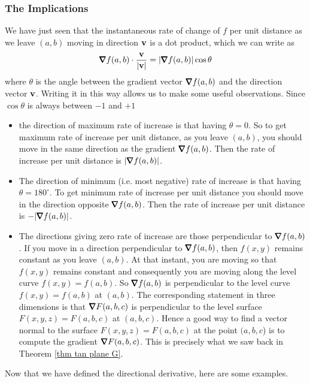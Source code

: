 \subsubsection{The Implications}
We have just seen that the instantaneous rate of change of $f$ per unit
distance as we leave $(a,b)$ moving in direction $\mathbf{v}$ is a dot product,
which we can write as
$$
\vnabla f(a,b)\cdot\frac{\vv}{|\vv|}
       =|\vnabla f(a,b)| \cos \theta
$$
where $\theta$ is the angle between the gradient vector $\vnabla f(a,b)$
and the direction vector $\mathbf{v}$. Writing it in this way allows us to make
some useful observations.
Since $\cos \theta$ is always between $-1$
and $+1$ 
\begin{itemize}
\item 
the direction of maximum rate of increase is that having
$\theta=0$. So to get maximum rate of increase per unit distance, as you 
leave $(a,b)$, you should move in the same direction as the gradient 
$\vnabla f(a,b)$. Then the rate of increase per unit distance is 
$|\vnabla f(a,b)|$.
\item
The direction of minimum (i.e. most negative) rate of increase  is that having
$\theta=180^\circ$. To get minimum rate of increase per unit distance you
should move in the direction opposite  $\vnabla f(a,b)$. Then the
rate of increase per unit distance is $-|\vnabla f(a,b)|$.

\item 
The directions giving zero rate of increase are those 
perpendicular to $\vnabla f(a,b)$. If you move in a direction
perpendicular to $\vnabla f(a,b)$, then $f(x,y)$ remains constant as
you leave $(a,b)$. At that instant, you are moving so that $f(x,y)$
remains constant and consequently you are moving along the level
curve $f(x,y)=f(a,b)$.  So $\vnabla f(a,b)$ is perpendicular to the
level curve $f(x,y)=f(a,b)$ at $(a,b)$. The corresponding statement
in three dimensions is that $\vnabla F(a,b,c)$ is perpendicular to the
level surface $F(x,y,z)=F(a,b,c)$ at $(a,b,c)$. Hence a good way to find a 
vector normal to the surface $F(x,y,z)=F(a,b,c)$ at the point $(a,b,c$) is to compute the gradient $\vnabla F(a,b,c)$. This is precisely what we saw back in
Theorem \ref{thm tan plane G}.
\end{itemize}

Now that we have defined the directional derivative, here are some examples.


